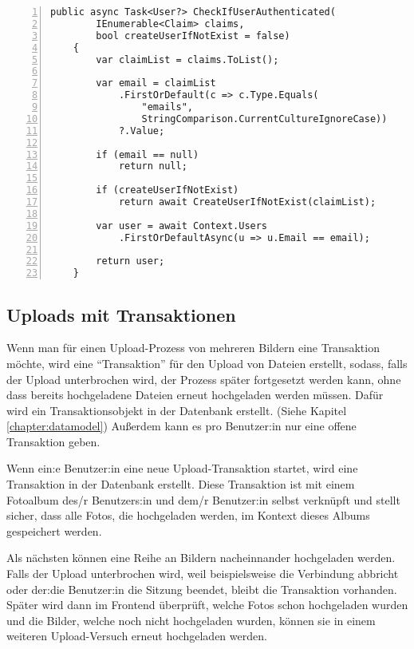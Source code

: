 \begin{lstlisting}[numbers=left,caption={Methode CheckIfUserAuthenticated},label={lst:method-check-user-auth}]
    public async Task<User?> CheckIfUserAuthenticated(
        IEnumerable<Claim> claims, 
        bool createUserIfNotExist = false)
    {
        var claimList = claims.ToList();
        
        var email = claimList
            .FirstOrDefault(c => c.Type.Equals(
                "emails", 
                StringComparison.CurrentCultureIgnoreCase))
            ?.Value;

        if (email == null)
            return null;

        if (createUserIfNotExist)
            return await CreateUserIfNotExist(claimList); 
        
        var user = await Context.Users
            .FirstOrDefaultAsync(u => u.Email == email);

        return user;
    }
\end{lstlisting}


\subsection{Uploads mit Transaktionen}

Wenn man für einen Upload-Prozess von mehreren Bildern eine Transaktion möchte, wird eine 
``Transaktion'' für den Upload von Dateien erstellt, sodass, falls der Upload unterbrochen 
wird, der Prozess später fortgesetzt werden kann, ohne dass bereits hochgeladene Dateien 
erneut hochgeladen werden müssen. Dafür wird ein Transaktionsobjekt in der Datenbank 
erstellt. (Siehe Kapitel \ref{chapter:datamodel}) Au\ss{}erdem kann es pro Benutzer:in nur 
eine offene Transaktion geben.

Wenn ein:e Benutzer:in eine neue Upload-Transaktion startet, wird eine Transaktion in der 
Datenbank erstellt. Diese Transaktion ist mit einem Fotoalbum des/r Benutzers:in und dem/r 
Benutzer:in selbst verknüpft und stellt sicher, dass alle Fotos, die hochgeladen werden, 
im Kontext dieses Albums gespeichert werden.

Als nächsten können eine Reihe an Bildern nacheinnander hochgeladen werden. 
Falls der Upload unterbrochen wird, weil beispielsweise die Verbindung abbricht oder der:die 
Benutzer:in die Sitzung beendet, bleibt die Transaktion vorhanden. Später wird dann im Frontend
überprüft, welche Fotos schon hochgeladen wurden und die Bilder, welche noch nicht hochgeladen 
wurden, können sie in einem weiteren Upload-Versuch erneut hochgeladen werden.

